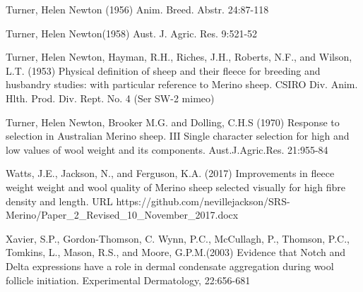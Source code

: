 \documentclass[titlepage]{article}  %
\begin{document}
\begin{thebibliography}{99}
Turner, Helen Newton (1956) Anim. Breed. Abstr. 24:87-118

Turner, Helen Newton(1958) Aust. J. Agric. Res. 9:521-52

Turner, Helen Newton, Hayman, R.H., Riches, J.H., Roberts, N.F., and Wilson, L.T. (1953) Physical definition of sheep and their fleece for breeding and husbandry studies: with particular reference to Merino sheep. CSIRO Div. Anim. Hlth. Prod. Div. Rept. No. 4 (Ser SW-2 mimeo)

Turner, Helen Newton, Brooker M.G. and Dolling, C.H.S (1970) Response to selection in Australian Merino sheep. III Single character selection for high and low values of wool weight and its components. Aust.J.Agric.Res. 21:955-84

Watts, J.E., Jackson, N., and Ferguson, K.A. (2017) Improvements in fleece weight weight and wool quality of Merino sheep selected visually for high fibre density and length. URL https://github.com/nevillejackson/SRS-Merino/Paper\_2\_Revised\_10\_November\_2017.docx 

Xavier, S.P., Gordon-Thomson, C. Wynn, P.C., McCullagh, P., Thomson, P.C., Tomkins, L., Mason, R.S., and Moore, G.P.M.(2003) Evidence that Notch and Delta expressions have a role in dermal condensate aggregation during wool follicle initiation. Experimental Dermatology, 22:656-681

\end{thebibliography}
\end{document}
